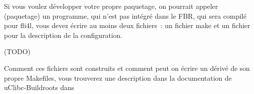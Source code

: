 
Si vous voulez développer votre propre paquetage, on pourrait appeler (paquetage)
un programme, qui n'est pas intégré dans le FBR, qui sera compilé pour
fli4l, vous devez écrire au moins deux fichiers~: un fichier make et un fichier
pour la description de la configuration.

(TODO)

Comment ces fichiers sont construits et comment peut on écrire un dérivé de
son propre Makefiles, vous trouverez une description dans la documentation de
uClibc-Buildroots dans
